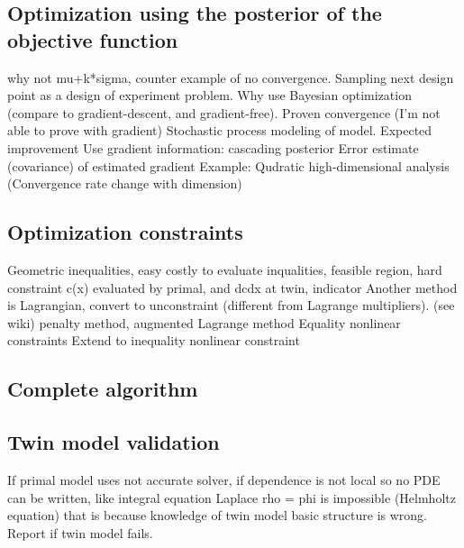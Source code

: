 \documentclass[a4paper,onecolumn]{article}
\theoremstyle{remark}
\begin{document}
\subsection{Optimization using the posterior of the objective function}
\label{bayesian_opt}
why not mu+k*sigma, counter example of no convergence.
Sampling next design point as a design of experiment problem.
Why use Bayesian optimization (compare to gradient-descent, and gradient-free). Proven convergence
(I'm not able to prove with gradient)
Stochastic process modeling of model.
Expected improvement
Use gradient information: cascading posterior
Error estimate (covariance) of estimated gradient
Example:
Qudratic high-dimensional analysis (Convergence rate change with dimension)
\subsection{Optimization constraints}
\label{constraints}
Geometric inequalities, easy
costly to evaluate inqualities, feasible region, hard
constraint c(x) evaluated by primal, and dcdx at twin, indicator
\cite{constraint Bayesian Opt}
Another method is Lagrangian, convert to unconstraint (different from Lagrange multipliers). 
(see wiki)
penalty method, augmented Lagrange method
Equality nonlinear constraints 
\cite{equality nonlinear constraint trust region opt}
Extend to inequality nonlinear constraint \cite{coarse discretization}

\subsection{Complete algorithm}
\label{complete algo}

\subsection{Twin model validation}
If primal model uses not accurate solver, if dependence is not local so no PDE can be written,
like integral equation
Laplace rho = phi is impossible (Helmholtz equation)
that is because knowledge of twin model basic structure is wrong.
Report if twin model fails.

\newpage
\end{document}
